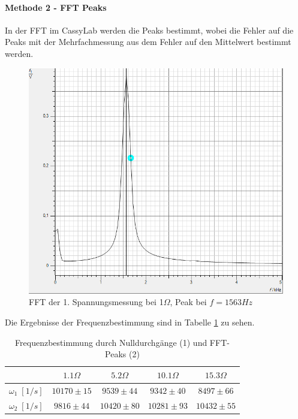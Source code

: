\documentclass[a4paper, 11pt]{article}
\begin{document}
\paragraph{Methode 2 - FFT Peaks} In der FFT im CassyLab werden die Peaks bestimmt, wobei die Fehler auf die Peaks mit der Mehrfachmessung aus dem Fehler auf den Mittelwert bestimmt werden.

\begin{figure}[H]
	\centering
	\includegraphics[scale=0.4]{Peakbestimmung.png}
	\caption{FFT der 1. Spannungsmessung bei 1$\Omega$, Peak bei $f=1563Hz$}
	\label{fig:fft}
\end{figure}

Die Ergebnisse der Frequenzbestimmung sind in Tabelle \ref{table:Frequenzen} zu sehen.

\begin{table}[H]
	\centering
	\renewcommand{\arraystretch}{1.2}
	\begin{tabular}{|c|c|c|c|c|}
		\hline 
		& $1.1 \Omega$ & $5.2 \Omega$ & $10.1 \Omega$ & $15.3 \Omega$ \\
		\hline 
		$\omega_{1} \;[1/s]$ & $10170 \pm 15$ & $9539 \pm 44$ & $9342 \pm 40$ & $8497 \pm 66$ \\
		\hline
		$\omega_{2} \;[1/s]$ & $9816 \pm 44$ & $ 10420 \pm 80$ & $ 10281 \pm 93$ & $10432 \pm 55$ \\
		\hline
	\end{tabular}
	\label{table:Frequenzen}
	\caption{Frequenzbestimmung durch Nulldurchgänge (1) und FFT-Peaks (2)}
\end{table}
\end{document}
